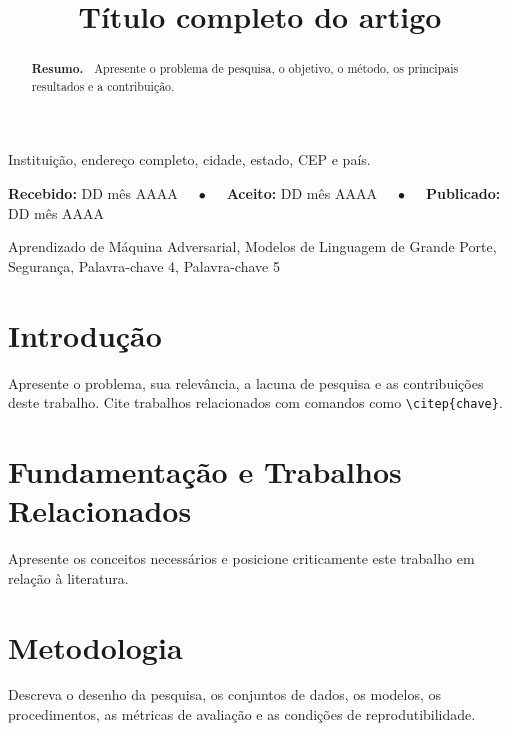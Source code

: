 \documentclass{sbc2023}
\title[Título curto]{Título completo do artigo}
\author[Silva et al. 202X]{
\affil{\textbf{Caio Vinícius Ribeiro da Silva}~
  \href{https://orcid.org/0000-0000-0000-0000}{\textcolor{orcidlogo}{\aiOrcid}}~
  \textcolor{blue}{\faEnvelopeO}~~[
  \textbf{Universidade de São Paulo}~|\href{mailto:email@usp.br}{\textbf{\textit{email@usp.br}}}]}

}
\begin{document}
\begin{frontmatter}
\maketitle

\begin{mail}
Instituição, endereço completo, cidade, estado, CEP e país.
\end{mail}

\begin{dates}
\small{\textbf{Recebido:} DD mês AAAA~~~$\bullet$~~~\textbf{Aceito:} DD mês AAAA~~~$\bullet$~~~\textbf{Publicado:} DD mês AAAA}
\end{dates}

\begin{abstract}
\textbf{Resumo.~}
Apresente o problema de pesquisa, o objetivo, o método, os principais resultados e a contribuição.
\end{abstract}

\begin{keywords}
Aprendizado de Máquina Adversarial, Modelos de Linguagem de Grande Porte, Segurança, Palavra-chave 4, Palavra-chave 5
\end{keywords}

\end{frontmatter}

\section{Introdução}
\label{sec:introduction}

Apresente o problema, sua relevância, a lacuna de pesquisa e as contribuições deste trabalho. Cite trabalhos relacionados com comandos como \verb|\citep{chave}|.

\section{Fundamentação e Trabalhos Relacionados}
\label{sec:background}

Apresente os conceitos necessários e posicione criticamente este trabalho em relação à literatura.

\section{Metodologia}
\label{sec:methodology}

Descreva o desenho da pesquisa, os conjuntos de dados, os modelos, os procedimentos, as métricas de avaliação e as condições de reprodutibilidade.
\end{document}

